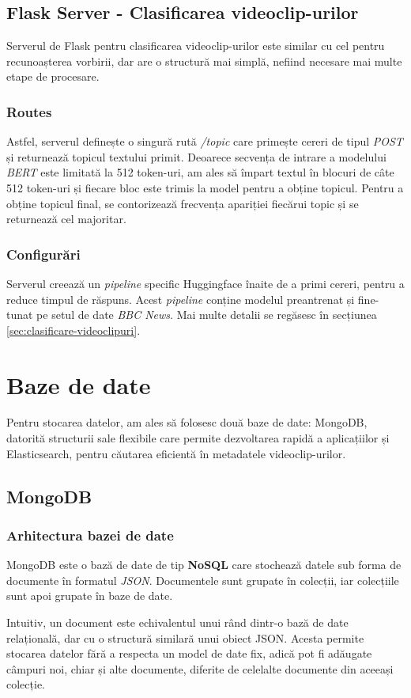 \subsection{Flask Server - Clasificarea videoclip-urilor}
Serverul de Flask pentru clasificarea videoclip-urilor este similar cu cel pentru recunoașterea vorbirii,
dar are o structură mai simplă, nefiind necesare mai multe etape de procesare.
\subsubsection{Routes}
\par
Astfel, serverul definește o singură rută \textit{/topic} care primește cereri de tipul \textit{POST}
și returnează topicul textului primit. Deoarece secvența de intrare a modelului \textit{BERT} este 
limitată la 512 token-uri, am ales să împart textul în blocuri de câte 512 token-uri și fiecare bloc
este trimis la model pentru a obține topicul. Pentru a obține topicul final, se contorizează frecvența
apariției fiecărui topic și se returnează cel majoritar.
\subsubsection{Configurări}
\par
Serverul creează un \textit{pipeline} specific Huggingface înaite de a primi cereri, pentru a reduce
timpul de răspuns. Acest \textit{pipeline} conține modelul preantrenat și fine-tunat pe setul de date
\textit{BBC News}. Mai multe detalii se regăsesc în secțiunea \ref{sec:clasificare-videoclipuri}.

\section{Baze de date}
Pentru stocarea datelor, am ales să folosesc două baze de date: MongoDB, datorită structurii sale
flexibile care permite dezvoltarea rapidă a aplicațiilor și Elasticsearch, pentru căutarea eficientă
în metadatele videoclip-urilor.
\subsection{MongoDB}
\subsubsection{Arhitectura bazei de date}
MongoDB este o bază de date de tip \textbf{NoSQL} care stochează datele sub forma de documente în 
formatul \textit{JSON}. Documentele sunt grupate în colecții, iar colecțiile sunt apoi grupate în
baze de date. 
\par
Intuitiv, un document este echivalentul unui rând dintr-o bază de date relațională, dar cu o structură
similară unui obiect JSON. Acesta permite stocarea datelor fără a respecta un model de date fix, adică
pot fi adăugate câmpuri noi, chiar și alte documente, diferite de celelalte documente din aceeași colecție.

